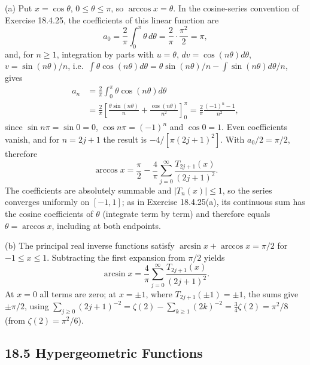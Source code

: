(a) Put $x=\cos\theta$, $0\le\theta\le\pi$, so $\arccos x=\theta$.
In the cosine-series convention of Exercise 18.4.25, the
coefficients of this linear function are
\[
a_0=\frac2\pi\int_0^\pi\theta\,d\theta=\frac2\pi\cdot\frac{\pi^2}2=\pi,
\]
and, for $n\ge1$, integration by parts with $u=\theta$,
$dv=\cos(n\theta)d\theta$, $v=\sin(n\theta)/n$, i.e.\
$\int\theta\cos(n\theta)d\theta=\theta\sin(n\theta)/n
-\int\sin(n\theta)d\theta/n$, gives
\begin{align*}
a_n
 &=\frac2\pi\int_0^\pi\theta\cos(n\theta)d\theta\\
 &=\frac2\pi\left[
       \frac{\theta\sin(n\theta)}n+\frac{\cos(n\theta)}{n^2}
       \right]_0^\pi
 =\frac2\pi\frac{(-1)^n-1}{n^2},
\end{align*}
since $\sin n\pi=\sin0=0$, $\cos n\pi=(-1)^n$ and $\cos0=1$.
Even coefficients vanish, and for $n=2j+1$ the result is
$-4/[\pi(2j+1)^2]$.  With $a_0/2=\pi/2$, therefore
\[
\boxed{\arccos x=\frac\pi2-\frac4\pi
 \sum_{j=0}^\infty\frac{T_{2j+1}(x)}{(2j+1)^2}}.
\]
The coefficients are absolutely summable and $|T_n(x)|\le1$, so the
series converges uniformly on $[-1,1]$; as in Exercise 18.4.25(a), its
continuous sum has the cosine coefficients of $\theta$ (integrate term
by term) and therefore equals $\theta=\arccos x$, including at both
endpoints.

(b) The principal real inverse functions satisfy
$\arcsin x+\arccos x=\pi/2$ for $-1\le x\le1$.
Subtracting the first expansion from $\pi/2$ yields
\[
\boxed{\arcsin x=\frac4\pi
 \sum_{j=0}^\infty\frac{T_{2j+1}(x)}{(2j+1)^2}}.
\]
At $x=0$ all terms are zero; at $x=\pm1$, where $T_{2j+1}(\pm1)=\pm1$,
the sums give $\pm\pi/2$, using
$\sum_{j\ge0}(2j+1)^{-2}=\zeta(2)-\sum_{k\ge1}(2k)^{-2}
=\frac34\zeta(2)=\pi^2/8$ (from $\zeta(2)=\pi^2/6$).

\subsection*{18.5 Hypergeometric Functions}

